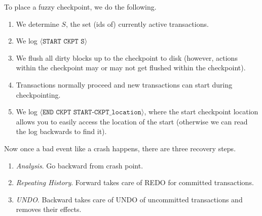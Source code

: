 \documentclass{article}
\begin{document}
      \begin{definition}
        To place a fuzzy checkpoint, we do the following. 
        \begin{enumerate}
          \item We determine $S$, the set (ids of) currently active transactions. 
          \item We log $\langle \texttt{START CKPT S} \rangle$ 
          \item We flush all dirty blocks up to the checkpoint to disk (however, actions within the checkpoint may or may not get flushed within the checkpoint). 
          \item Transactions normally proceed and new transactions can start during checkpointing. 
          \item We log $\langle \texttt{END CKPT START-CKPT\_location} \rangle$, where the start checkpoint location allows you to easily access the location of the start (otherwise we can read the log backwards to find it). 
        \end{enumerate}
        Now once a bad event like a crash happens, there are three recovery steps. 
        \begin{enumerate}
          \item \textit{Analysis}. Go backward from crash point. 
          \item \textit{Repeating History}. Forward takes care of REDO for committed transactions. 
          \item \textit{UNDO}. Backward takes care of UNDO of uncommitted transactions and removes their effects. 
        \end{enumerate}
      \end{definition} 
\end{document}
